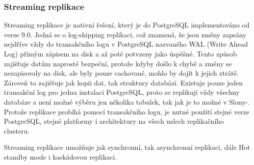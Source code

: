 \subsubsection{Streaming replikace}
\label{Streaming}

Streaming replikace je nativní řešení, který je do PostgreSQL implementováno od verze 9.0. Jedná se o log-shipping replikaci, což znamená, že jsou změny zapsány nejdříve vždy do transakčního logu v PostgreSQL nazvaného WAL (Write Ahead Log) přímým zápisem na disk a až poté potvzeny jako úspěšné. Tento způsob zajišťuje datům naprosté bezpeční, protože kdyby došlo k chybě a změny se nezapisovaly na disk, ale byly pouze cachované, mohlo by dojít k jejich ztrátě. Zároveň to zajišťuje jak kopii dat, tak struktury databází. Existuje pouze jeden transakční log pro jednu instalaci PostgreSQL, proto se replikují vždy všechny databáze a není možné výběru jen několika tabulek, tak jak je to možné v Slony-. Protože replikace probíhá pomocí transakčního logu, je nutné použití stejné verze PostgreSQL, stejné platformy i architektury na všech uzlech replikačního clusteru. 

Streaming replikace umožňuje jak synchronní, tak asynchronní replikaci, dále Hot standby mode i kaskádovou replikaci.


